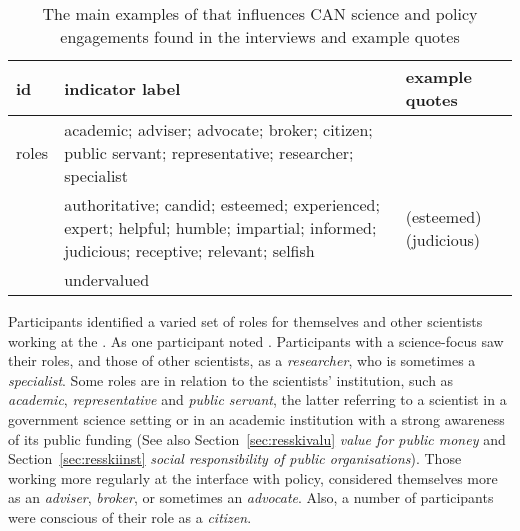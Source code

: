 \begin{table}[!ht]
\footnotesize
\caption{The main examples of \ismsr{} that influences CAN science and policy  engagements found in the interviews and example quotes}\label{tab:resrole}
\begin{tabular}{L{.15\linewidth}L{.35\linewidth}L{.5\linewidth}} \hline
\textbf{id} & \textbf{indicator label} & \textbf{example quotes} \\ \hline \hline
roles & academic; adviser; advocate; broker; citizen; public servant; representative; researcher; specialist &   \vfill {} \\[2mm]\rule{0pt}{4ex}
 & authoritative; candid; esteemed; experienced; expert; helpful; humble; impartial; informed; judicious; receptive; relevant; selfish &  (esteemed) \vfill {} (judicious) \\[2mm] \rule{0pt}{4ex}
& undervalued &  \\[5mm] \hline
\end{tabular}
\end{table}


Participants identified a varied set of roles for themselves and other scientists working at the \SPI. As one participant noted . Participants with a science-focus saw their roles, and those of other scientists, as a \emph{researcher}, who is sometimes a \emph{specialist}. Some roles are in relation to the scientists' institution, such as \emph{academic}, \emph{representative} and \emph{public servant}, the latter referring to a scientist in a government science setting or in an academic institution with a strong awareness of its public funding (See also Section~\ref{sec:resskivalu} \emph{value for public money} and Section~\ref{sec:resskiinst} \emph{social responsibility of public organisations}). Those working more regularly at the interface with policy, considered themselves more as an \emph{adviser}, \emph{broker}, or sometimes an \emph{advocate}. Also, a number of participants were conscious of their role as a \emph{citizen}.

